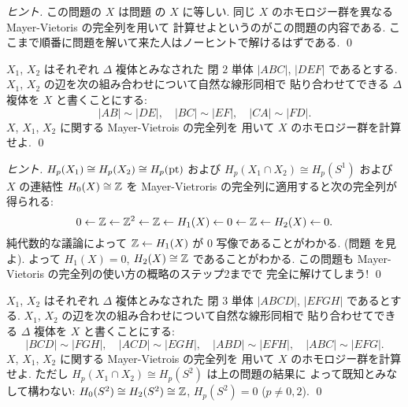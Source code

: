 \documentclass[12pt,twoside]{jarticle}
\begin{document}
\begin{proof}[ヒント]
  この問題の $X$ は問題  の $X$ に等しい.
  同じ $X$ のホモロジー群を異なる Mayer-Vietoris の完全列を用いて
  計算せよというのがこの問題の内容である.
  ここまで順番に問題を解いて来た人はノーヒントで解けるはずである.
  \qed
\end{proof}

\begin{question}[2次元球面]
  $X_1$, $X_2$ はそれぞれ $\Delta$ 複体とみなされた
  閉 $2$ 単体 $|ABC|$, $|DEF|$ であるとする.
  $X_1$, $X_2$ の辺を次の組み合わせについて自然な線形同相で
  貼り合わせてできる $\Delta$ 複体を $X$ と書くことにする:
  \begin{equation*}
    |AB|\sim|DE|, \quad
    |BC|\sim|EF|, \quad
    |CA|\sim|FD|.
  \end{equation*}
  $X$, $X_1$, $X_2$ に関する Mayer-Vietrois の完全列を
  用いて $X$ のホモロジー群を計算せよ.
  \qed
\end{question}

\begin{proof}[ヒント]
  $H_p(X_1)\cong H_p(X_2)\cong H_p(\mathop{\mathrm{pt}})$ 
  および $H_p(X_1\cap X_2)\cong H_p(S^1)$ 
  および $X$ の連結性 $H_0(X)\cong {\mathbb Z}$ を
  Mayer-Vietroris の完全列に適用すると次の完全列が得られる:
  \begin{equation*}
    0
    \leftarrow {\mathbb Z}
    \leftarrow {\mathbb Z}^2
    \leftarrow {\mathbb Z}
    \leftarrow H_1(X)
    \leftarrow 0
    \leftarrow {\mathbb Z}
    \leftarrow H_2(X)
    \leftarrow 0.
  \end{equation*}
  純代数的な議論によって ${\mathbb Z}\leftarrow H_1(X)$ が $0$ 写像であることがわかる.
  (問題  を見よ).
  よって $H_1(X)=0$, $H_2(X)\cong{\mathbb Z}$ であることがわかる.
  この問題も Mayer-Vietoris の完全列の使い方の概略のステップ2までで
  完全に解けてしまう!
  \qed
\end{proof}

\begin{question}[3次元球面]
  $X_1$, $X_2$ はそれぞれ $\Delta$ 複体とみなされた
  閉 $3$ 単体 $|ABCD|$, $|EFGH|$ であるとする.
  $X_1$, $X_2$ の辺を次の組み合わせについて自然な線形同相で
  貼り合わせてできる $\Delta$ 複体を $X$ と書くことにする:
  \begin{equation*}
    |BCD|\sim|FGH|, \quad
    |ACD|\sim|EGH|, \quad
    |ABD|\sim|EFH|, \quad
    |ABC|\sim|EFG|.
  \end{equation*}
  $X$, $X_1$, $X_2$ に関する Mayer-Vietrois の完全列を
  用いて $X$ のホモロジー群を計算せよ.
  ただし $H_p(X_1\cap X_2)\cong H_p(S^2)$ は上の問題の結果に
  よって既知とみなして構わない: 
  $H_0(S^2)\cong H_2(S^2)\cong{\mathbb Z}$, $H_p(S^2)=0$ ($p\ne 0,2$).
  \qed
\end{question}
\end{document}
